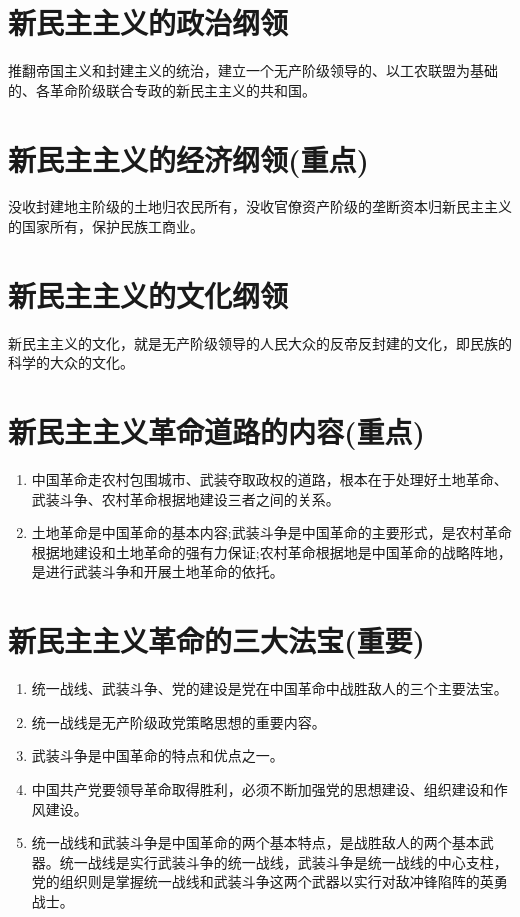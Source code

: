 \documentclass[12pt, a4paper, oneside]{ctexbook}
\begin{document}
\section{新民主主义的政治纲领}

推翻帝国主义和封建主义的统治，建立一个无产阶级领导的、以工农联盟为基础的、各革命阶级联合专政的新民主主义的共和国。

\section{新民主主义的经济纲领(重点)}

没收封建地主阶级的土地归农民所有，没收官僚资产阶级的垄断资本归新民主主义的国家所有，保护民族工商业。

\section{新民主主义的文化纲领}

新民主主义的文化，就是无产阶级领导的人民大众的反帝反封建的文化，即民族的科学的大众的文化。

\section{新民主主义革命道路的内容(重点)}

\begin{enumerate}[label=（\arabic*）]
\item 中国革命走农村包围城市、武装夺取政权的道路，根本在于处理好土地革命、武装斗争、农村革命根据地建设三者之间的关系。

\item 土地革命是中国革命的基本内容;武装斗争是中国革命的主要形式，是农村革命根据地建设和土地革命的强有力保证;农村革命根据地是中国革命的战略阵地，是进行武装斗争和开展土地革命的依托。
\end{enumerate}

\section{新民主主义革命的三大法宝(重要)}

\begin{enumerate}[label=（\arabic*）]
\item 统一战线、武装斗争、党的建设是党在中国革命中战胜敌人的三个主要法宝。

\item 统一战线是无产阶级政党策略思想的重要内容。

\item 武装斗争是中国革命的特点和优点之一。

\item 中国共产党要领导革命取得胜利，必须不断加强党的思想建设、组织建设和作风建设。

\item 统一战线和武装斗争是中国革命的两个基本特点，是战胜敌人的两个基本武器。统一战线是实行武装斗争的统一战线，武装斗争是统一战线的中心支柱，党的组织则是掌握统一战线和武装斗争这两个武器以实行对敌冲锋陷阵的英勇战士。
\end{enumerate}
\end{document}
